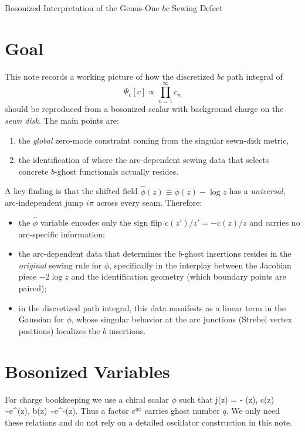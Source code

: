 \documentclass[12pt]{article}
\begin{document}
\begin{center}
\LARGE Bosonized Interpretation of the Genus-One $bc$ Sewing Defect
\end{center}

\section{Goal}

This note records a working picture of how the discretized $bc$ path integral of
\[
\Psi_c[c] \propto \prod_{n=1}^\infty c_n
\]
should be reproduced from a bosonized scalar with background charge on the \emph{sewn disk}. The main points are:
\begin{enumerate}
\item the \emph{global} zero-mode constraint coming from the singular sewn-disk metric,
\item the identification of where the arc-dependent sewing data that selects concrete $b$-ghost functionals actually resides.
\end{enumerate}

A key finding is that the shifted field $\hat\phi(z) \equiv \phi(z) - \log z$ has a \emph{universal}, arc-independent jump $i\pi$ across every seam. Therefore:
\begin{itemize}
\item the $\hat\phi$ variable encodes only the sign flip $c(z')/z' = -c(z)/z$ and carries no arc-specific information;
\item the arc-dependent data that determines the $b$-ghost insertions resides in the \emph{original} sewing rule for $\phi$, specifically in the interplay between the Jacobian piece $-2\log z$ and the identification geometry (which boundary points are paired);
\item in the discretized path integral, this data manifests as a linear term in the Gaussian for $\phi$, whose singular behavior at the arc junctions (Strebel vertex positions) localizes the $b$ insertions.
\end{itemize}

\section{Bosonized Variables}

For charge bookkeeping we use a chiral scalar $\phi$ such that
\be
j(z) = - \pa \phi(z), \qquad c(z) \sim e^{\phi(z)}, \qquad b(z) \sim e^{-\phi(z)}.
\ee
Thus a factor $e^{q\phi}$ carries ghost number $q$. We only need these relations and do not rely on a detailed oscillator construction in this note.
\end{document}
